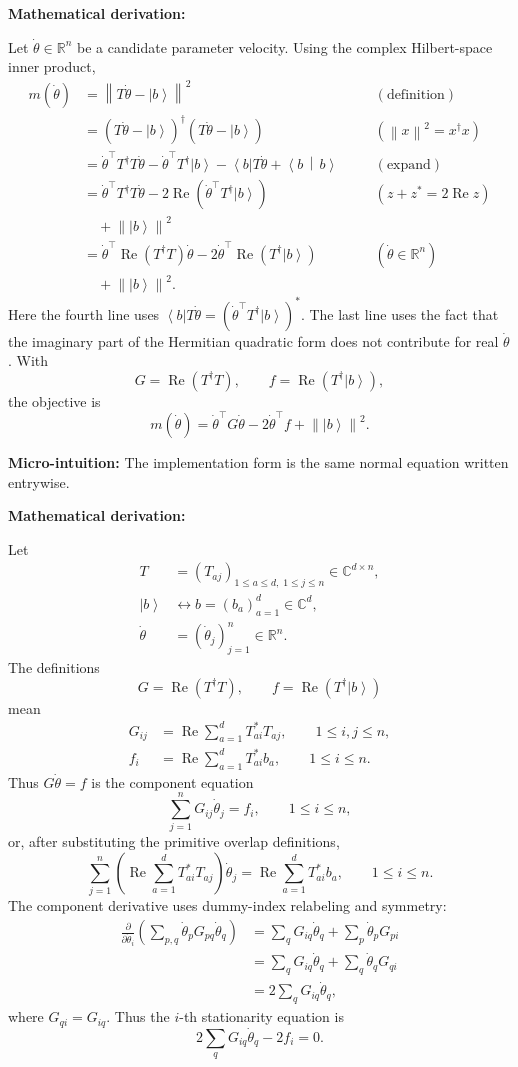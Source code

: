 \documentclass[10pt,twocolumn]{article}
\newcommand{\ket}[1]{\left|#1\right\rangle}
\newcommand{\bra}[1]{\left\langle#1\right|}
\newcommand{\braket}[2]{\left\langle #1\,\middle|\,#2\right\rangle}
\newcommand{\norm}[1]{\left\lVert #1\right\rVert}
\newcommand{\R}{\mathbb R}
\newcommand{\C}{\mathbb C}
\newcommand{\Real}{\operatorname{Re}}
\newcommand{\micro}[1]{%
  \par\smallskip
  \noindent\textcolor{deepblue}{\textbf{Micro-intuition:}} #1
  \par\smallskip}
\newcommand{\deriv}{%
  \par\noindent\textcolor{deepviolet}{\textbf{Mathematical derivation:}}\par\vspace{-1mm}}
\begin{document}
\deriv
Let \(\dot\theta\in\R^n\) be a candidate parameter velocity. Using the complex
Hilbert-space inner product,
\[
\begin{alignedat}{2}
m(\dot\theta)
&=\norm{T\dot\theta-\ket b}^2
&&\quad\scriptstyle(\text{definition})\\
&=(T\dot\theta-\ket b)^\dagger(T\dot\theta-\ket b)
&&\quad\scriptstyle(\norm{x}^2=x^\dagger x)\\
&=\dot\theta^\top T^\dagger T\dot\theta
-\dot\theta^\top T^\dagger\ket b
-\bra b T\dot\theta
+\braket{b}{b}
&&\quad\scriptstyle(\text{expand})\\
&=\dot\theta^\top T^\dagger T\dot\theta
-2\Real\!\left(\dot\theta^\top T^\dagger\ket b\right)
&&\quad\scriptscriptstyle(z+z^*=2\Real z)\\
&\quad+\norm{\ket b}^2\\
&=\dot\theta^\top\Real(T^\dagger T)\dot\theta
-2\dot\theta^\top\Real(T^\dagger\ket b)
&&\quad\scriptscriptstyle(\dot\theta\in\R^n)\\
&\quad+\norm{\ket b}^2.
\end{alignedat}
\]
Here the fourth line uses
\(\bra bT\dot\theta=(\dot\theta^\top T^\dagger\ket b)^*\). The last line uses
the fact that the imaginary part of the Hermitian quadratic form does not
contribute for real \(\dot\theta\). With
\[
G=\Real(T^\dagger T),
\qquad
f=\Real(T^\dagger\ket b),
\]
the objective is
\[
m(\dot\theta)
=\dot\theta^\top G\dot\theta-2\dot\theta^\top f+\norm{\ket b}^2.
\]

\micro{The implementation form is the same normal equation written entrywise.}

\deriv
Let
\[
\begin{aligned}
T&=(T_{aj})_{1\le a\le d,\;1\le j\le n}\in\C^{d\times n},\\
\ket b&\leftrightarrow b=(b_a)_{a=1}^{d}\in\C^d,\\
\dot\theta&=(\dot\theta_j)_{j=1}^{n}\in\R^n.
\end{aligned}
\]
The definitions
\[
G=\Real(T^\dagger T),
\qquad
f=\Real(T^\dagger\ket b)
\]
mean
\[
\begin{aligned}
G_{ij}
&=\Real\sum_{a=1}^{d}T_{ai}^*T_{aj},
\qquad
1\le i,j\le n,\\
f_i
&=\Real\sum_{a=1}^{d}T_{ai}^*b_a,
\qquad
1\le i\le n.
\end{aligned}
\]
Thus \(G\dot\theta=f\) is the component equation
\[
\sum_{j=1}^{n}G_{ij}\dot\theta_j=f_i,
\qquad
1\le i\le n,
\]
or, after substituting the primitive overlap definitions,
\[
\sum_{j=1}^{n}
\left(
\Real\sum_{a=1}^{d}T_{ai}^*T_{aj}
\right)
\dot\theta_j
=
\Real\sum_{a=1}^{d}T_{ai}^*b_a,
\qquad
1\le i\le n.
\]
The component derivative uses dummy-index relabeling and symmetry:
\[
\begin{aligned}
\frac{\partial}{\partial\dot\theta_i}
\left(\sum_{p,q}\dot\theta_pG_{pq}\dot\theta_q\right)
&=
\sum_q G_{iq}\dot\theta_q+\sum_p\dot\theta_pG_{pi}\\
&=
\sum_q G_{iq}\dot\theta_q+\sum_q\dot\theta_qG_{qi}\\
&=
2\sum_qG_{iq}\dot\theta_q,
\end{aligned}
\]
where \(G_{qi}=G_{iq}\). Thus the \(i\)-th stationarity equation is
\[
2\sum_qG_{iq}\dot\theta_q-2f_i=0.
\]
\end{document}
